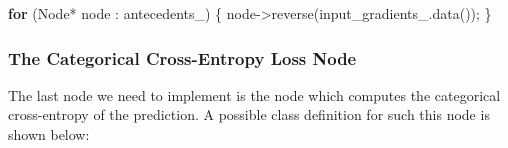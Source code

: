 \documentclass[
]{article}
\newenvironment{Shaded}{}{}
\newcommand{\ControlFlowTok}[1]{\textcolor[rgb]{0.00,0.44,0.13}{\textbf{#1}}}
\newcommand{\NormalTok}[1]{#1}
\newcommand{\VariableTok}[1]{\textcolor[rgb]{0.10,0.09,0.49}{#1}}
\begin{document}
\begin{Shaded}
\begin{Highlighting}[]
    \ControlFlowTok{for}\NormalTok{ (Node* node : }\VariableTok{antecedents\_}\NormalTok{)}
\NormalTok{    \{}
\NormalTok{        node{-}\textgreater{}reverse(}\VariableTok{input\_gradients\_}\NormalTok{.data());}
\NormalTok{    \}}
\end{Highlighting}
\end{Shaded}

\hypertarget{the-categorical-cross-entropy-loss-node}{%
\subsubsection{The Categorical Cross-Entropy Loss
Node}\label{the-categorical-cross-entropy-loss-node}}

The last node we need to implement is the node which computes the
categorical cross-entropy of the prediction. A possible class definition
for such this node is shown below:
\end{document}
